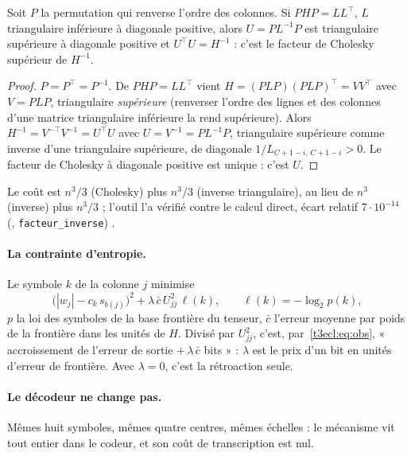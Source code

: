 \begin{lemme}\label{t3ecl:lem:chol}
Soit $P$ la permutation qui renverse l'ordre des colonnes. Si $PHP = LL^\top$, $L$ triangulaire inférieure à diagonale positive, alors $U = P L^{-1} P$ est triangulaire supérieure à diagonale positive et $U^\top U = H^{-1}$ : c'est le facteur de Cholesky supérieur de $H^{-1}$.
\end{lemme}

\begin{proof}
$P = P^\top = P^{-1}$. De $PHP = LL^\top$ vient $H = (PLP)(PLP)^\top = VV^\top$ avec $V = PLP$, triangulaire \emph{supérieure} (renverser l'ordre des lignes et des colonnes d'une matrice triangulaire inférieure la rend supérieure). Alors $H^{-1} = V^{-\top} V^{-1} = U^\top U$ avec $U = V^{-1} = P L^{-1} P$, triangulaire supérieure comme inverse d'une triangulaire supérieure, de diagonale $1/L_{C+1-i,\,C+1-i} > 0$. Le facteur de Cholesky à diagonale positive est unique : c'est $U$.
\end{proof}

Le coût est $n^3/3$ (Cholesky) plus $n^3/3$ (inverse triangulaire), au lieu de $n^3$ (inverse) plus $n^3/3$ \calc ; l'outil l'a vérifié contre le calcul direct, écart relatif $7\cdot10^{-14}$ (, \texttt{facteur\_inverse}) \mes.

\paragraph{La contrainte d'entropie.} Le symbole $k$ de la colonne $j$ minimise
\begin{equation}\label{t3ecl:eq:lagrange}
\bigl(|w_j| - c_k\, s_{b(j)}\bigr)^2 + \lambda\, \bar c\, U_{jj}^2\, \ell(k), \qquad \ell(k) = -\log_2 p(k),
\end{equation}
$p$ la loi des symboles de la base frontière du tenseur, $\bar c$ l'erreur moyenne par poids de la frontière dans les unités de $H$. Divisé par $U_{jj}^2$, c'est, par~\eqref{t3ecl:eq:obs}, « accroissement de l'erreur de sortie $+\,\lambda\,\bar c$ bits » : $\lambda$ est le prix d'un bit en unités d'erreur de frontière. Avec $\lambda = 0$, c'est la rétroaction seule.

\paragraph{Le décodeur ne change pas.} Mêmes huit symboles, mêmes quatre centres, mêmes échelles : le mécanisme vit tout entier dans le codeur, et son coût de transcription est nul.

